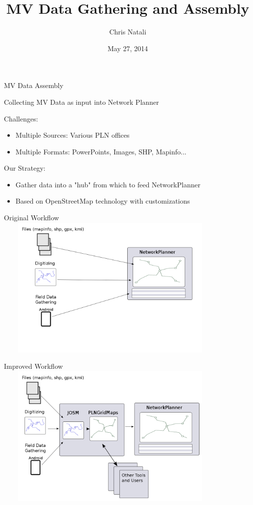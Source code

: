 \documentclass{beamer}
\title{MV Data Gathering and Assembly}
\author{Chris Natali}
\institute{Modi Labs at Columbia University}
\date{May 27, 2014}
\begin{document}
\begin{frame}{MV Data Assembly}

  Collecting MV Data as input into Network Planner

  \bigskip 

  Challenges: 
  \begin{itemize}
  \item[] Multiple Sources:  Various PLN offices
  \item[] Multiple Formats:  PowerPoints, Images, SHP, Mapinfo...
  \end{itemize}
 
  \bigskip 

  Our Strategy: 
  \begin{itemize}
  \item[] Gather data into a "hub" from which to feed NetworkPlanner
  \item[] Based on OpenStreetMap technology with customizations
  \end{itemize}


\end{frame}

\begin{frame}{Original Workflow}
  \includegraphics[width=4.5in,height=2.75in]{../diagrams/gridmaps-flow-original.png}
\end{frame}

\begin{frame}{Improved Workflow}
  \includegraphics[width=4.5in,height=2.75in]{../diagrams/gridmaps-flow.png}
\end{frame}
\end{document}
